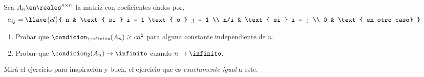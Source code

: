 \begin{enunciado}{\ejExtra} 
  Sea $A_n \en \reales^{n \times n}$ la matriz con coeficientes dados por,
  $$
    a_{ij} =
    \llave{cl}{
      n & \text{ si } i = 1 \text{ o } j = 1 \\
      n/i & \text{ si } i = j \\
      0 & \text{ en otro caso}
    }
  $$
  \begin{enumerate}[label=\alph*)]
    \item Probar que $\condicion_\infinito (A_n) \geq cn^2$ para alguna constante independiente de $n$.
    \item Probar que $\condicion_2(A_n) \to \infinito$ cuando $n \to \infinito$.
  \end{enumerate}
\end{enunciado}

Mirá el ejercicio  para inspiración y bueh, el ejercicio  que es \textit{exactamente igual} a este.

